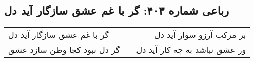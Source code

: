 \begin{center}
\section*{رباعی شماره ۴۰۳: گر با غم عشق سازگار آید دل}
\label{sec:sh403}
\begin{longtable}{l p{0.5cm} r}
گر با غم عشق سازگار آید دل
&&
بر مرکب آرزو سوار آید دل
\\
گر دل نبود کجا وطن سازد عشق
&&
ور عشق نباشد به چه کار آید دل
\\
\end{longtable}
\end{center}
